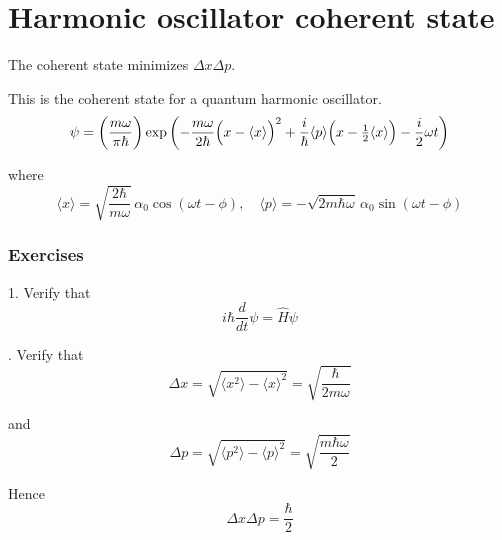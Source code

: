 

\section*{Harmonic oscillator coherent state}

The coherent state minimizes $\Delta x\Delta p$.

\bigskip
This is the coherent state for a quantum harmonic oscillator.
\begin{equation*}
\psi=\biggl(\frac{m\omega}{\pi\hbar}\biggr)
\exp\left(
-\frac{m\omega}{2\hbar}\Bigl(x-\langle x\rangle\Bigr)^2
+\frac{i}{\hbar}\langle p\rangle\Bigl(x-\tfrac{1}{2}\langle x\rangle\Bigr)
-\frac{i}{2}\omega t
\right)
\end{equation*}

where
\begin{equation*}
\langle x\rangle=\sqrt{\frac{2\hbar}{m\omega}}\,\alpha_0\cos(\omega t-\phi),\quad
\langle p\rangle=-\sqrt{2m\hbar\omega}\,\alpha_0\sin(\omega t-\phi)
\end{equation*}

\subsubsection*{Exercises}

1. Verify that
\begin{equation*}
i\hbar\frac{d}{dt}\psi=\hat H\psi
\end{equation*}

. Verify that
\begin{equation*}
\Delta x=\sqrt{\langle x^2\rangle-\langle x\rangle^2}
=\sqrt{\frac{\hbar}{2m\omega}}
\end{equation*}

and
\begin{equation*}
\Delta p=\sqrt{\langle p^2\rangle-\langle p\rangle^2}
=\sqrt{\frac{m\hbar\omega}{2}}
\end{equation*}

Hence
\begin{equation*}
\Delta x\Delta p=\frac{\hbar}{2}
\end{equation*}


